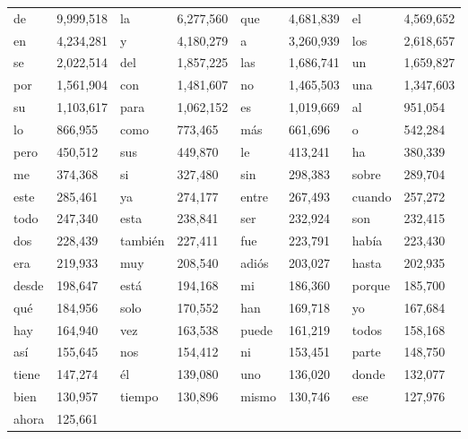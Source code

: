\begin{table}
\begin{tabular}{|l|l|l|l|l|l|l|l|}
		de	& 9,999,518  &
    	la	& 6,277,560 &
     	que 	& 4,681,839 &
    	el	& 4,569,652 \\
     	en	& 4,234,281  &
     	y	& 4,180,279 &
     	a	& 3,260,939 	 &
     	los	& 2,618,657 	 \\
     	se	& 2,022,514 	  &
    	del	& 1,857,225 	& 
    	las	& 1,686,741  &
    	un	& 1,659,827 	  \\
    	por	& 1,561,904 	  &
        con 	& 1,481,607 	 &
     	no	& 1,465,503 	&
    	una 	& 1,347,603 	\\
    	su	& 1,103,617 	&
    	para	& 1,062,152 	&
    	es	& 1,019,669 	&
    	al	  & 951,054	  \\
    	lo	  & 866,955	  &
    	como 	 &  773,465	  &
    	m\'as 	 &  661,696	  &
    	o	  & 542,284	  \\
    	pero	&   450,512	  &
    	sus 	 &  449,870	  &
     	le	  & 413,241	  &
    	ha	 &  380,339	  \\
    	me 	 &  374,368	  &
    	si	 &  327,480	  &
    	sin	 &  298,383	  &
    	sobre	&   289,704	  \\
    	este	 &  285,461	 &
    	ya	  & 274,177	&
    	entre	&   267,493	&
    	cuando 	 &  257,272	 \\
    	todo	 &  247,340	  &
    	esta	 &  238,841	&
    	ser	  & 232,924	  &
    	son 	&   232,415	  \\
    	dos 	 &  228,439	 &
    	tambi\'en 	&   227,411	&
    	fue	 &  223,791	  &
    	hab\'ia	&   223,430	\\
    	era	  & 219,933	 &
    	muy 	&   208,540	&
    	adi\'os & 	  203,027	 &
    	hasta	&   202,935	\\
    	desde 	&   198,647 & 
    	est\'a	 &  194,168 &
    	mi	&   186,360	 & 
    	porque & 	  185,700	\\
    	qu\'e 	&   184,956	& 
    	solo	 &  170,552	&
    	han 	&   169,718	 & 
    	yo	 &  167,684	  \\
    	hay & 	  164,940	& 
    	vez	 &  163,538	  &
    	puede & 	  161,219	  & 
    	todos & 	  158,168	  \\
    	as\'i	&   155,645	  & 
    	nos 	&   154,412	  &
    	ni	&   153,451	  & 
    	parte	 &  148,750	 \\
    	tiene	 &  147,274	   & 
    	\'el	 &  139,080	   &
    	uno 	 &  136,020	  & 
    	donde 	 &  132,077	  \\
    	bien	 &  130,957	   & 
    	tiempo 	 &  130,896	   &
    	mismo  	 &  130,746	   & 
    	ese 	 &  127,976	 \\
    	ahora	 &  125,661	   & 

\end{tabular}
\end{table}
